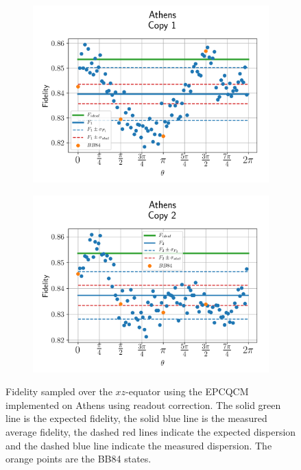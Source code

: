 \begin{figure}[H]
  \centering
  \begin{subfigure}{.5\textwidth}
    \centering
    \includegraphics[width=\textwidth]{Figures/Economical/IBM/OnlyEquator/results_corrected_athens_copy1.png}
    \label{fig:epc_corrected_athens_equator_1}
  \end{subfigure}%
  \begin{subfigure}{.5\textwidth}
    \centering
    \includegraphics[width=\textwidth]{Figures/Economical/IBM/OnlyEquator/results_corrected_athens_copy2.png}
    \label{fig:epc_corrected_athens_equator_2}
  \end{subfigure}
  \vspace{-0.5cm}
  \caption{Fidelity sampled over the $xz$-equator using the EPCQCM implemented on Athens using readout correction. The solid green line is the expected fidelity, the solid blue line is the measured average fidelity, the dashed red lines indicate the expected dispersion and the dashed blue line indicate the measured dispersion. The orange points are the BB84 states.}
  \label{fig:epc_corrected_athens_equator}
\end{figure}

